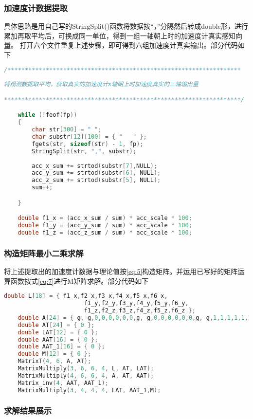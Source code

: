 \documentclass{ctexart}
\begin{document}
\subsubsection{加速度计数据提取}
具体思路是用自己写的StringSplit()函数将数据按“，”分隔然后转成double形，进行累加再取平均后，可换成同一单位，得到一组一轴朝上时的加速度计真实感知向量。
打开六个文件重复上述步骤，即可得到六组加速度计真实输出。部分代码如下
\begin{lstlisting}[language=C]
/*******************************************************************
	
将观测数据取平均，获取真实的加速度计x轴朝上时加速度真实的三轴输出量

********************************************************************/

	while (!feof(fp))
	{
		char str[300] = " ";
		char substr[12][100] = { "   " };
		fgets(str, sizeof(str) - 1, fp);
		StringSplit(str, ",", substr);
		
		acc_x_sum += strtod(substr[7],NULL);
		acc_y_sum += strtod(substr[6], NULL);
		acc_z_sum += strtod(substr[5], NULL);
		sum++;

	}

	double f1_x = (acc_x_sum / sum) * acc_scale * 100;
	double f1_y = (acc_y_sum / sum) * acc_scale * 100;
	double f1_z = (acc_z_sum / sum) * acc_scale * 100;
\end{lstlisting}
\subsubsection{构造矩阵最小二乘求解}
将上述提取出的加速度计数据与理论值按\eqref{eq:5}构造矩阵。并运用已写好的矩阵运算函数按式\eqref{eq:7}进行M矩阵求解。部分代码如下
\begin{lstlisting}[language=C]
      double L[18] = { f1_x,f2_x,f3_x,f4_x,f5_x,f6_x,
                       f1_y,f2_y,f3_y,f4_y,f5_y,f6_y,
                       f1_z,f2_z,f3_z,f4_z,f5_z,f6_z };
	double A[24] = { g,-g,0,0,0,0,0,0,g,-g,0,0,0,0,0,0,g,-g,1,1,1,1,1,1};
	double AT[24] = { 0 };
	double LAT[12] = { 0 };
	double AAT[16] = { 0 };
	double AAT_1[16] = { 0 };
	double M[12] = { 0 };
	MatrixT(4, 6, A, AT);
	MatrixMultiply(3, 6, 6, 4, L, AT, LAT);
	MatrixMultiply(4, 6, 6, 4, A, AT, AAT);
	Matrix_inv(4, AAT, AAT_1);
	MatrixMultiply(3, 4, 4, 4, LAT, AAT_1,M);
\end{lstlisting}
\subsubsection{求解结果展示}
\end{document}
